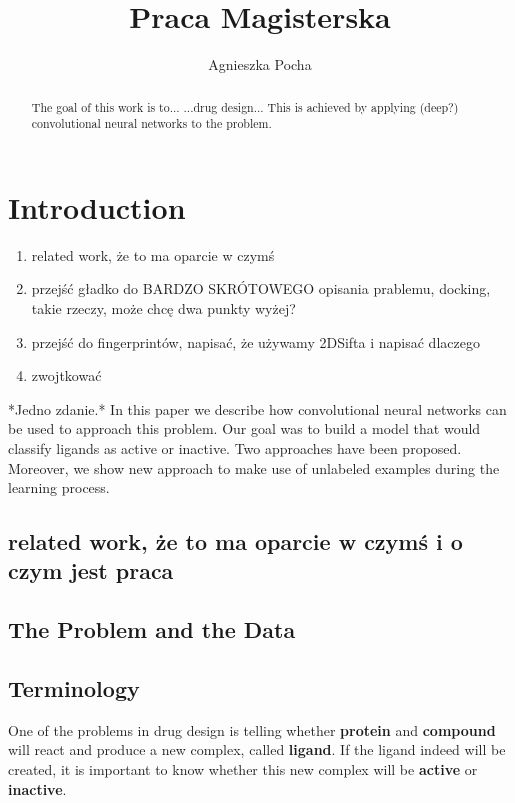 \documentclass[a4paper,10pt]{report}
\title{Praca Magisterska}
\author{Agnieszka Pocha}
\begin{document}
  \maketitle
  \begin{abstract}
    The goal of this work is to... ...drug design... This is achieved by applying (deep?) convolutional neural networks to the problem.
  \end{abstract}
  \tableofcontents
    
  \chapter{Introduction} %
    \begin{enumerate}
     \item related work, że to ma oparcie w czymś
     \item przejść gładko do BARDZO SKRÓTOWEGO opisania prablemu, docking, takie rzeczy, może chcę dwa punkty wyżej?
     \item przejść do fingerprintów, napisać, że używamy 2DSifta i napisać dlaczego
     
     \item zwojtkować
    \end{enumerate}
    
    *Jedno zdanie.* In this paper we describe how convolutional neural networks can be used to approach this problem. Our goal was to build a model that would classify ligands as active or inactive. Two approaches have been proposed. Moreover, we show new approach to make use of unlabeled examples during the learning process.

  
    \section{related work, że to ma oparcie w czymś i o czym jest praca}
  
    \section{The Problem and the Data}
    
    \section{Terminology} %
     One of the problems in drug design is telling whether \textbf{protein} and \textbf{compound} will react and produce a new complex, called \textbf{ligand}. If the ligand indeed will be created, it is important to know whether this new complex will be \textbf{active} or \textbf{inactive}.\\
    
\end{document}
